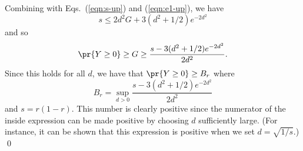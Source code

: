 Combining with Eqs.~(\ref{eqn:s-up}) and (\ref{eqn:e1-up}), we have
\[s \leq 2d^2 G + 3(d^2 + 1/2) e^{-2d^2}\]
and so
\[ \pr{Y\geq 0} \geq G \geq \frac{s - 3(d^2 + 1/2) e^{-2d^2}}{2d^2}.\]
Since this holds for all $d$, we have that $\pr{Y\geq 0}\geq B_r$
where
\[ B_r = \sup_{d>0}  \frac{s - 3(d^2 + 1/2) e^{-2d^2}}{2d^2}\]
and $s = r(1-r)$.
This number is clearly positive since the numerator of the inside
expression can be made positive by choosing $d$ sufficiently large.
(For instance, it can be shown that this expression is positive when we
set $d=\sqrt{1/s}$.)
\qed











